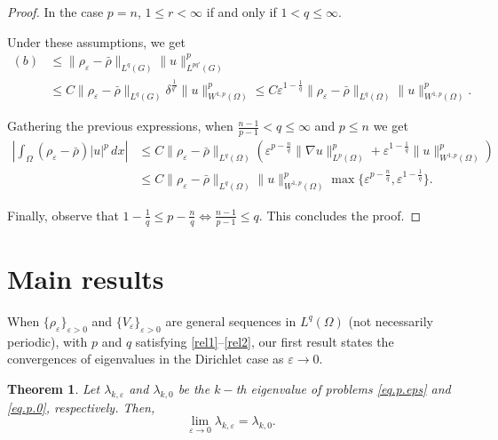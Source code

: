 \documentclass[12pt]{amsart}
\newtheorem{thm}{Theorem}[section]
\theoremstyle{definition}
\theoremstyle{remark}
\numberwithin{equation}{section}
\begin{document}
\begin{proof}
In the case $p=n$, $1\leq r < \infty$ if and only if $1<q\leq \infty$.

Under these assumptions, we get
\begin{align*}
(b)&\leq \|\rho_\varepsilon -\bar \rho\|_{L^q(G)} \|u\|_{L^{pq'}(G)}^p\\
&\leq C \|\rho_\varepsilon -\bar \rho\|_{L^q(G)} \delta^\frac{1}{q'} \|u\|_{W^{1,p}(\Omega)}^p\leq C \varepsilon^{1-\frac{1}{q}}\|\rho_\varepsilon -\bar \rho\|_{L^q(\Omega)} \|u\|_{W^{1,p}(\Omega)}^p.
\end{align*}

Gathering the previous expressions, when $\frac{n-1}{p-1}< q \leq \infty$ and $p\leq n$ we get
\begin{align*}
\left|\int_\Omega (\rho_\varepsilon-\bar \rho) |u|^p\,dx \right| &\leq C  \|\rho_\varepsilon - \bar \rho\|_{L^q(\Omega)} \left( \varepsilon^{p-\frac{n}{q}} \|\nabla u\|_{L^p(\Omega)}^p +  \varepsilon^{1-\frac{1}{q}}  \|u\|_{W^{1,p}(\Omega)}^p \right)\\
&\leq 
C  \|\rho_\varepsilon - \bar \rho\|_{L^q(\Omega)} \|u\|_{W^{1,p}(\Omega)}^p  \max\{\varepsilon^{p-\frac{n}{q}}, \varepsilon^{1-\frac1q} \}.
\end{align*}

Finally, observe that $1-\frac1q \leq p-\frac{n}{q} \iff \frac{n-1}{p-1}\leq q$.  This concludes the proof.
\end{proof}


 
  

\section{Main results} \label{sec3}
When $\{ \rho_\varepsilon\}_{\varepsilon>0}$ and $\{V_\varepsilon\}_{\varepsilon>0}$ are general sequences in $L^q(\Omega)$ (not necessarily periodic), with $p$ and $q$ satisfying  \eqref{rel1}--\eqref{rel2}, our first result states the convergences of eigenvalues in the Dirichlet case as $\varepsilon\to 0$.

\begin{thm} \label{teo.d.sinorden}
Let $\lambda_{k,\varepsilon}$ and $\lambda_{k,0}$ be the $k-$th eigenvalue of problems \eqref{eq.p.eps} and \eqref{eq.p.0}, respectively. Then, 
$$
\lim_{\varepsilon\to 0} \lambda_{k,\varepsilon} = \lambda_{k,0}.
$$
\end{thm}
\end{document}

